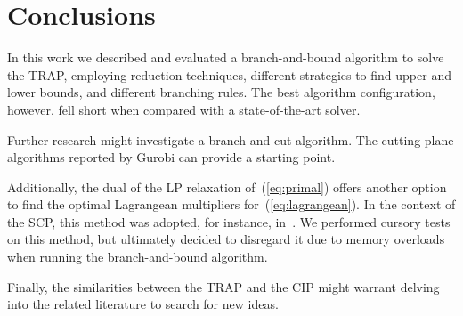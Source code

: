 \documentclass[runningheads]{llncs}
\begin{document}
\section{Conclusions}
\label{sec:conclusions}

In this work we described and evaluated a branch-and-bound algorithm to solve the TRAP, employing reduction techniques, different strategies to find upper and lower bounds, and different branching rules. The best algorithm configuration, however, fell short when compared with a state-of-the-art solver.

Further research might investigate a branch-and-cut algorithm. The cutting plane algorithms reported by Gurobi can provide a starting point.

Additionally, the dual of the LP relaxation of~(\ref{eq:primal}) offers another option to find the optimal Lagrangean multipliers for~(\ref{eq:lagrangean}). In the context of the SCP, this method was adopted, for instance, in~\cite{beasley-1987-algorithm,balas-ho-2009-set-covering}. We performed cursory tests on this method, but ultimately decided to disregard it due to memory overloads when running the branch-and-bound algorithm.

Finally, the similarities between the TRAP and the CIP might warrant delving into the related literature to search for new ideas. 




\end{document}
